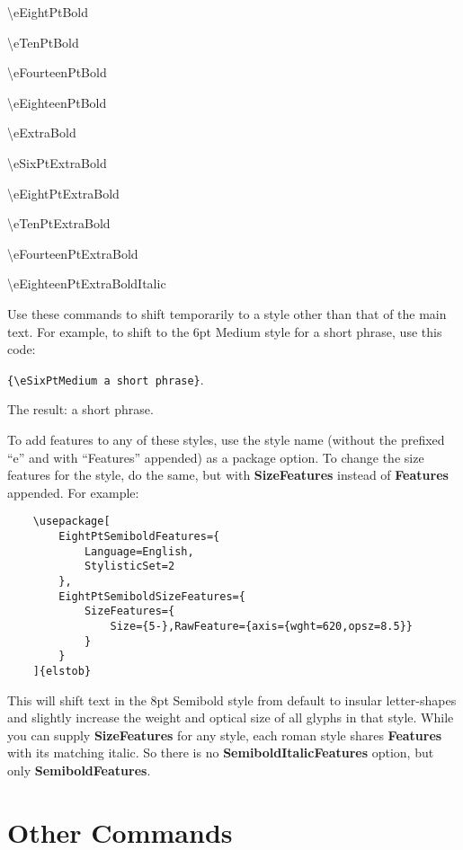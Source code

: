 \documentclass[12pt]{article}
\begin{document}
\begin{multicols}{2}
\noindent\textbackslash eEightPtBold

\noindent\textbackslash eTenPtBold

\noindent\textbackslash eFourteenPtBold

\noindent\textbackslash eEighteenPtBold

\noindent\textbackslash eExtraBold

\noindent\textbackslash eSixPtExtraBold

\noindent\textbackslash eEightPtExtraBold

\noindent\textbackslash eTenPtExtraBold

\noindent\textbackslash eFourteenPtExtraBold

\noindent\textbackslash eEighteenPtExtraBoldItalic
\end{multicols}

\noindent Use these commands
to shift temporarily to a style other than that of the main text.
For example, to shift to the 6pt Medium style for a short phrase, use
this code:
\begin{center}
{\color{BrickRed}\small\verb|{\eSixPtMedium a short phrase}|}.
\end{center}
The result: {\eSixPtMedium a short phrase}.

To add features to any of these styles, use the style name
(without the prefixed “e” and with “Features” appended)
as a package option. To change the size features for the style,
do the same, but with \textbf{SizeFeatures} instead of \textbf{Features}
appended. For example:

\footnotesize
\begin{verbatim}
    \usepackage[
        EightPtSemiboldFeatures={
            Language=English,
            StylisticSet=2
        },
        EightPtSemiboldSizeFeatures={
            SizeFeatures={
                Size={5-},RawFeature={axis={wght=620,opsz=8.5}}
            }
        }
    ]{elstob}
\end{verbatim}\normalsize

\noindent This will shift text in the 8pt Semibold style from default to insular
letter-shapes and slightly increase the weight and optical size of all glyphs in that style.
While you can supply \textbf{SizeFeatures} for any style, each roman style shares
\textbf{Features} with its matching italic. So there is no \textbf{SemiboldItalicFeatures}
option, but only \textbf{SemiboldFeatures}.

\section{Other Commands}
\end{document}
